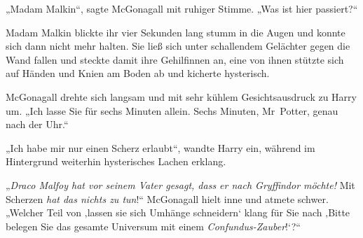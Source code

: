 „Madam Malkin“, sagte McGonagall mit ruhiger Stimme.
„Was ist hier passiert?“

Madam Malkin blickte ihr vier Sekunden lang stumm in die Augen und konnte sich dann nicht mehr halten. Sie ließ sich unter schallendem Gelächter gegen die Wand fallen und steckte damit ihre Gehilfinnen an, eine von ihnen stützte sich auf Händen und Knien am Boden ab und kicherte hysterisch.

McGonagall drehte sich langsam und mit sehr kühlem Gesichtsausdruck zu Harry um.
„Ich lasse Sie für sechs Minuten allein. Sechs Minuten, Mr~Potter, genau nach der Uhr.“

„Ich habe mir nur einen Scherz erlaubt“, wandte Harry ein, während im Hintergrund weiterhin hysterisches Lachen erklang.

„\emph{Draco Malfoy hat vor seinem Vater gesagt, dass er nach Gryffindor möchte!} Mit Scherzen \emph{hat das nichts zu tun}!“ McGonagall hielt inne und atmete schwer.
„Welcher Teil von ‚lassen sie sich Umhänge schneidern‘ klang für Sie nach ‚Bitte belegen Sie das gesamte Universum mit einem \emph{Confundus-Zauber}!‘?“

